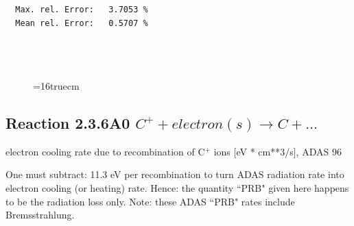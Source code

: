 \documentclass[12pt,dvips]{article}
\begin{document}
\begin{small}
\begin{verbatim}
  Max. rel. Error:   3.7053 %
  Mean rel. Error:   0.5707 %




\end{verbatim}\end{small}
\begin{figure} \label{2.8il}
\epsfxsize=16truecm 
\end{figure}
\newpage

\subsection{
  Reaction 2.3.6A0  $C^+ + electron(s) \rightarrow C   + ... $
}
electron cooling rate due to recombination of C$^+$ ions [eV * cm**3/s],
ADAS 96

One must subtract: 11.3 eV per recombination to turn ADAS radiation
rate into electron cooling (or heating) rate. Hence: the quantity
``PRB" given here happens to be the radiation loss only. Note: these
ADAS ``PRB" rates include Bremsstrahlung.
\end{document}
